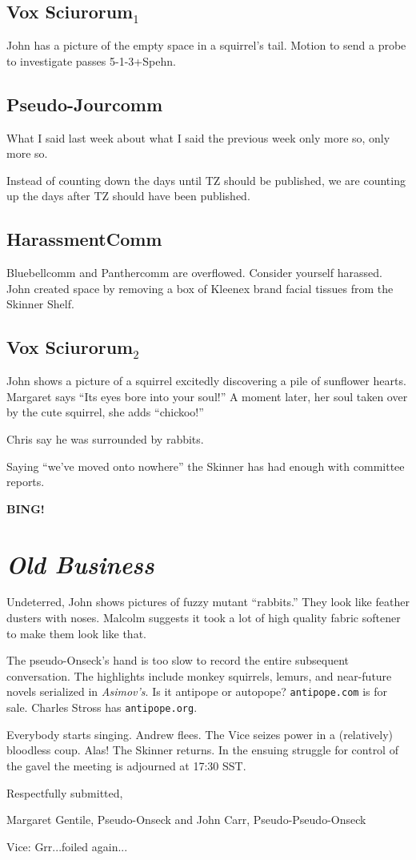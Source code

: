 \documentclass[10pt]{article}
\newcommand{\bing}{{\bf BING!} }
\newcommand{\goto}[1]{\bing \vskip 12pt \section*{{\em{#1}}}}
\begin{document}
\subsection*{Vox Sciurorum$_1$}

John has a picture of the empty space in a squirrel's tail.
Motion to send a probe to investigate passes \hbox{5-1-3+Spehn}.

\subsection*{Pseudo-Jourcomm}

What I said last week about what I said the previous week only more so,
only more so.

Instead of counting down the days until TZ should be published,
we are counting up the days after TZ should have been published.

\subsection*{HarassmentComm}

Bluebellcomm and Panthercomm are overflowed.
Consider yourself harassed.  John created space
by removing a box of Kleenex brand facial tissues
from the Skinner Shelf.

\subsection*{Vox Sciurorum$_2$}

John shows a picture of a squirrel excitedly discovering
a pile of sunflower hearts.  Margaret says ``Its eyes bore
into your soul!''  A moment later, her soul taken over by
the cute squirrel, she adds ``chickoo!''

Chris say he was surrounded by rabbits.

Saying ``we've moved onto nowhere'' the Skinner has had enough
with committee reports.

\goto{Old Business}

Undeterred, John shows pictures of fuzzy mutant ``rabbits.''
They look like feather dusters with noses.  Malcolm suggests
it took a lot of high quality fabric softener to make them
look like that.

The pseudo-Onseck's hand is too slow to record the entire
subsequent conversation.  The highlights include monkey
squirrels, lemurs, and near-future novels serialized in
{\it Asimov's}.  Is it antipope or autopope?  {\tt antipope.com}
is for sale.  Charles Stross has {\tt antipope.org}.

Everybody starts singing.  Andrew flees.  The Vice seizes power
in a (relatively) bloodless coup.  Alas!  The Skinner returns.
In the ensuing struggle for control of the gavel the meeting
is adjourned at 17:30 SST.

\vspace{18pt}

\centerline{Respectfully submitted,}
\centerline{Margaret Gentile, Pseudo-Onseck and John Carr, Pseudo-Pseudo-Onseck}

Vice: Grr...foiled again...
\end{document}
